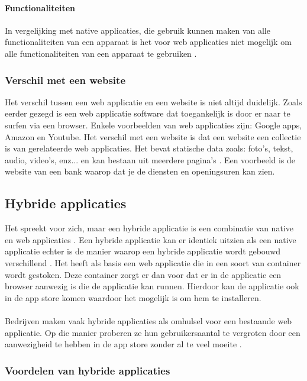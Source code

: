 \paragraph{Functionaliteiten}
In vergelijking met native applicaties, die gebruik kunnen maken van alle functionaliteiten van een 
apparaat is het voor web applicaties niet mogelijk om alle functionaliteiten van een apparaat te gebruiken 
\autocite{Laarhoven2021}.

\subsubsection{Verschil met een website}
Het verschil tussen een web applicatie en een website is niet altijd duidelijk. Zoals eerder gezegd 
is een web applicatie software dat toegankelijk is door er naar te surfen via een browser. 
Enkele voorbeelden van web applicaties zijn: Google apps, Amazon en Youtube. Het verschil met 
een website is dat een website een collectie is van gerelateerde web applicaties. Het bevat statische 
data zoals: foto's, tekst, audio, video's, enz... en kan bestaan uit meerdere pagina's 
\autocite{sugandha2022}. Een voorbeeld is de website van een bank waarop dat je de diensten en 
openingsuren kan zien.

\subsection{Hybride applicaties}
Het spreekt voor zich, maar een hybride applicatie is een combinatie van native en web 
applicaties \autocite{Denko2021}. Een hybride applicatie kan er identiek uitzien als een 
native applicatie echter is de manier waarop een hybride applicatie wordt gebouwd 
verschillend \autocite{Beeproger2023}. Het heeft als basis een web applicatie die in 
een soort van container wordt gestoken. Deze container zorgt er dan voor dat er in de 
applicatie een browser aanwezig is die de applicatie kan runnen. Hierdoor kan de applicatie 
ook in de app store komen waardoor het mogelijk is om hem te installeren. 
\\\\
Bedrijven maken vaak hybride applicaties als omhulsel voor een bestaande web applicatie. 
Op die manier proberen ze hun gebruikersaantal te vergroten door een aanwezigheid te hebben 
in de app store zonder al te veel moeite \autocite{Budiu2016}. 

\subsubsection{Voordelen van hybride applicaties}
